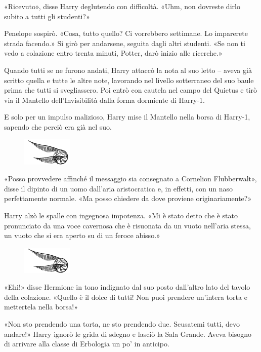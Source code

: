 «Ricevuto», disse Harry deglutendo con difficoltà. «Uhm, non dovreste dirlo subito a tutti gli studenti?»

Penelope sospirò. «Cosa, tutto quello? Ci vorrebbero settimane. Lo imparerete strada facendo.» Si girò per andarsene, seguita dagli altri studenti. «Se non ti vedo a colazione entro trenta minuti, Potter, darò inizio alle ricerche.»

Quando tutti se ne furono andati, Harry attaccò la nota al suo letto – aveva già scritto quella e tutte le altre note, lavorando nel livello sotterraneo del suo baule prima che tutti si svegliassero. Poi entrò con cautela nel campo del Quietus e tirò via il Mantello dell’Invisibilità dalla forma dormiente di Harry-1.

E solo per un impulso malizioso, Harry mise il Mantello nella borsa di Harry-1, sapendo che perciò era già nel suo.

\begin{figure}[h!]
        \includegraphics[scale=0.4]{boccino.png}
        \centering
\end{figure}

«Posso provvedere affinché il messaggio sia consegnato a Cornelion Flubberwalt», disse il dipinto di un uomo dall’aria aristocratica e, in effetti, con un naso perfettamente normale. «Ma posso chiedere da dove proviene originariamente?»

Harry alzò le spalle con ingegnosa impotenza. «Mi è stato detto che è stato pronunciato da una voce cavernosa che è risuonata da un vuoto nell’aria stessa, un vuoto che si era aperto su di un feroce abisso.»

\begin{figure}[h!]
        \includegraphics[scale=0.4]{boccino.png}
        \centering
\end{figure}

«Ehi!» disse Hermione in tono indignato dal suo posto dall’altro lato del tavolo della colazione. «Quello è il dolce di tutti! Non puoi prendere un’intera torta e mettertela nella borsa!»

«Non sto prendendo una torta, ne sto prendendo due. Scusatemi tutti, devo andare!» Harry ignorò le grida di sdegno e lasciò la Sala Grande. Aveva bisogno di arrivare alla classe di Erbologia un po’ in anticipo.

